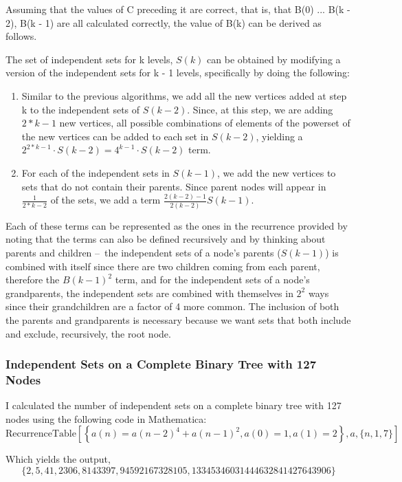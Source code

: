 \documentclass[11pt]{article}
\begin{document}
Assuming that the values of C preceding it are correct, that is, that B(0) ... B(k - 2), B(k - 1) are all calculated correctly, the value of B(k) can be derived as follows. 

The set of independent sets for k levels, $S(k)$ can be obtained by modifying a version of the independent sets for k - 1 levels, specifically by doing the following:\begin{enumerate}
	\item Similar to the previous algorithms, we add all the new vertices added at step k to the independent sets of $S(k-2)$. Since, at this step, we are adding $2*{k-1}$ new vertices, all possible combinations of elements of the powerset of the new vertices can be added to each set in $S(k-2)$, yielding a $2^{2*{k-1}}\cdot S(k-2) = 4^{k-1}\cdot S(k-2)$ term.
	\item For each of the independent sets in $S(k-1)$, we add the new vertices to sets that do not contain their parents. Since parent nodes will appear in $\frac{1}{2*{k-2}}$ of the sets, we add a term $\frac{2(k-2) - 1}{2({k-2})}S(k-1)$.
	\end{enumerate}
	Each of these terms can be represented as the ones in the recurrence provided by noting that the terms can also be defined recursively and by thinking about parents and children – the independent sets of a node's parents ($S(k-1)$) is combined with itself since there are two children coming from each parent, therefore the $B(k-1)^2$ term, and for the independent sets of a node's grandparents, the independent sets are combined with themselves in $2^2$ ways since their grandchildren are a factor of 4 more common. The inclusion of both the parents and grandparents is necessary because we want sets that both include and exclude, recursively, the root node. 
	
\subsubsection{Independent Sets on a Complete Binary Tree with 127 Nodes}

I calculated the number of independent sets on a complete binary tree with 127 nodes using the following code in Mathematica:
\begin{displaymath}
\text{RecurrenceTable}\left[\left\{a(n)=a(n-2)^4+a(n-1)^2,a(0)=1,a(1)=2\right\},a,\{n,1,7\}\right]
\end{displaymath}

Which yields the output, 
\begin{displaymath}
	\{2,5,41,2306,8143397,94592167328105,13345346031444632841427643906\}
\end{displaymath}
\end{document}
